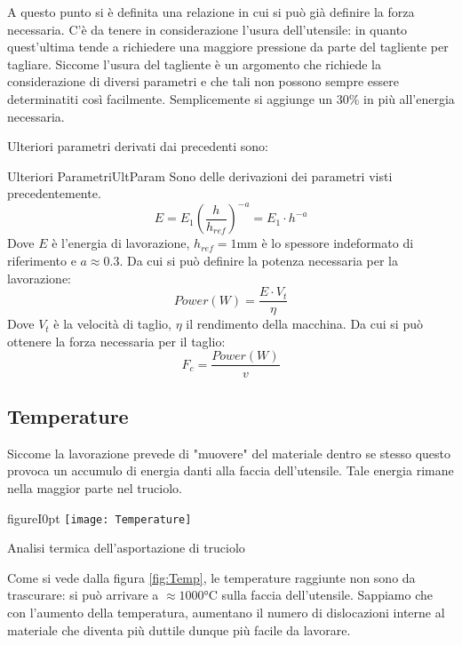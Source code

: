 A questo punto si è definita una relazione in cui si può già definire la forza necessaria.
C'è da tenere in considerazione l'usura dell'utensile: in quanto quest'ultima tende
a richiedere una maggiore pressione da parte del tagliente per tagliare.
Siccome l'usura del tagliente è un argomento che richiede la considerazione di diversi
parametri e che tali non possono sempre essere determinatiti così facilmente.
Semplicemente si aggiunge un $30\%$ in più all'energia necessaria.

Ulteriori parametri derivati dai precedenti sono:
\begin{definition}{Ulteriori Parametri}{UltParam}
Sono delle derivazioni dei parametri visti precedentemente.
\begin{equation}
E = E_1 \left(\frac{h}{h_{ref}}\right)^{-a} = E_1 \cdot h^{-a}
\end{equation}
Dove $E$ è l'energia di lavorazione, $h_{ref} = 1\unit{\mm}$ è lo spessore indeformato di 
riferimento e $a \approx 0.3$.
Da cui si può definire la potenza necessaria per la lavorazione:
\begin{equation}
Power(W) = \frac{E \cdot V_t}{\eta}
\end{equation}
Dove $V_t$ è la velocità di taglio, $\eta$ il rendimento della macchina.
Da cui si può ottenere la forza necessaria per il taglio:
\begin{equation}
F_c = \frac{Power(W)}{v}
\end{equation}
\end{definition}

\subsection{Temperature}
Siccome la lavorazione prevede di "muovere" del materiale dentro se stesso
questo provoca un accumulo di energia danti alla faccia dell'utensile.
Tale energia rimane nella maggior parte nel truciolo.

\begin{wrapfloat}{figure}{I}{0pt}
\texttt{[image: Temperature]}
\caption{Analisi termica dell'asportazione di truciolo}
\label{fig:Temp}
\end{wrapfloat}

Come si vede dalla figura \ref{fig:Temp}, le temperature raggiunte non sono da 
trascurare: si può arrivare a $\approx 1000\unit{\celsius}$ sulla faccia dell'utensile.
Sappiamo che con l'aumento della temperatura, aumentano il numero di dislocazioni
interne al materiale che diventa più duttile dunque più facile da lavorare.

